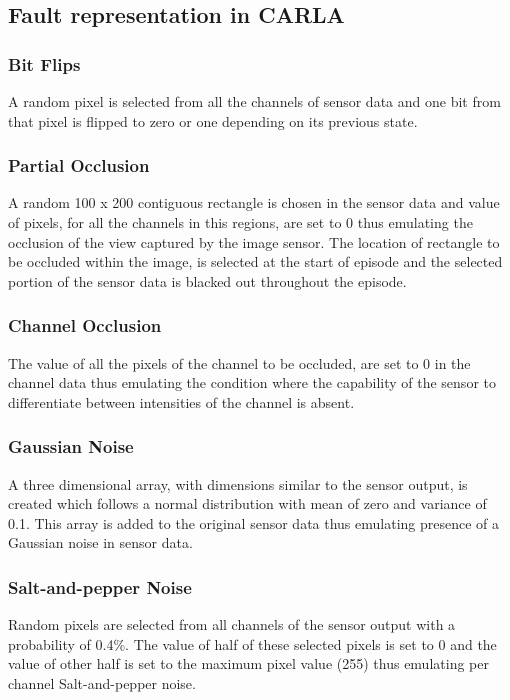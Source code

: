\subsection{Fault representation in CARLA} \label{Appendix:A}

\medskip

\subsubsection{Bit Flips} A random pixel is selected from all the channels of sensor data and one bit from that pixel is flipped to zero or one depending on its previous state.

\medskip

\subsubsection{Partial Occlusion} A random 100 x 200 contiguous rectangle is chosen in the sensor data and value of pixels, for all the channels in this regions, are set to 0 thus emulating the occlusion of the view captured by the image sensor. The location of rectangle to be occluded within the image, is selected at the start of episode and the selected portion of the sensor data is blacked out throughout the episode. 

\medskip

\subsubsection{Channel Occlusion} The value of all the pixels of the channel to be occluded, are set to 0 in the channel data thus emulating the condition where the capability of the sensor to differentiate between intensities of the channel is absent.

\medskip

\subsubsection{Gaussian Noise} A three dimensional array, with dimensions similar to the sensor output, is created which follows a normal distribution with mean of zero and variance of 0.1. This array is added to the original sensor data thus emulating presence of a Gaussian noise in sensor data.

\medskip

\subsubsection{Salt-and-pepper Noise} Random pixels are selected from all channels of the sensor output with a probability of 0.4\%. The value of half of these selected pixels is set to 0 and the value of other half is set to the maximum pixel value (255) thus emulating per channel Salt-and-pepper noise.

